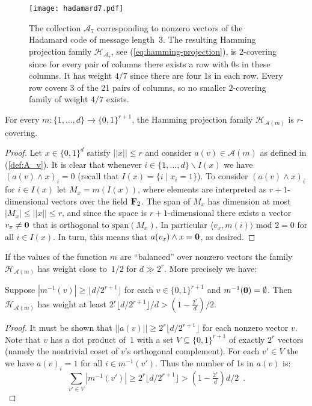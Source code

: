 \documentclass[prodmode,acmtalg]{acmsmall}
\newcommand{\floor}[1]{\lfloor{#1}\rfloor}
\begin{document}
\begin{figure}[t]
	\begin{center}
\texttt{[image: hadamard7.pdf]}
\caption{The collection $\mathcal{A}_7$ corresponding to nonzero vectors of the Hadamard code of message length~3. The resulting Hamming projection family  $\mathcal{H}_{\mathcal{A}_7}$, see (\ref{eq:hamming-projection}), is $2$-covering since for every pair of columns there exists a row with 0s in these columns. It has weight $4/7$ since there are four 1s in each row.
Every row covers 3 of the 21 pairs of columns, so no smaller $2$-covering family of weight $4/7$ exists.}\label{fig:hadamard7}
	\end{center}
\end{figure}

\begin{lemma}\label{lemma:covering1}
For every $m: \{1,\dots,d\} \rightarrow \{0,1\}^{r+1}$, the Hamming projection family $\mathcal{H}_{\mathcal{A}(m)}$ is $r$-covering.
\end{lemma}
\begin{proof}
Let $x\in \{0,1\}^d$ satisfy $||x|| \leq r$ and consider $a(v)\in \mathcal{A}(m)$ as defined in (\ref{def:A_v}).
It is clear that whenever $i\in \{1,\dots,d\} \backslash I(x)$ we have $(a(v) \wedge x)_i = 0$ (recall that $I(x) = \{ i \; | \; x_i = 1\}$).
To consider $(a(v)\wedge x)_i$ for $i\in I(x)$ let $M_x = m(I(x))$, where elements are interpreted as $r+1$-dimensional vectors over the field ${\bf F}_2$.
The span of $M_x$ has dimension at most $|M_x| \leq ||x|| \leq r$, and since the space is $r+1$-dimensional there exists a vector $v_x\ne {\bf 0}$ that is orthogonal to $\text{span}(M_x)$.
In particular $\langle v_x,m(i)\rangle \text{ mod } 2 = 0$ for all $i\in I(x)$.
In turn, this means that $a(v_x) \wedge x = {\bf 0}$, as desired. 
\end{proof}

If the values of the function $m$ are ``balanced'' over nonzero vectors the family $\mathcal{H}_{\mathcal{A}(m)}$ has weight close to~$1/2$ for $d\gg 2^r$. 
More precisely we have:
\begin{lemma}\label{lemma:weight}
Suppose $|m^{-1}(v)|\geq \floor{d/2^{r+1}}$ for each $v\in \{0,1\}^{r+1}$ and $m^{-1}({\bf 0}) = \emptyset$. Then $\mathcal{H}_{\mathcal{A}(m)}$ has weight at least $2^r \floor{d/2^{r+1}}/d > \left(1-\tfrac{2^r}{d}\right)/2$.
\end{lemma}
\begin{proof}
It must be shown that $||a(v)|| \geq 2^r \floor{d/2^{r+1}}$ for each nonzero vector $v$.
Note that $v$ has a dot product of~1 with a set $V \subseteq \{0,1\}^{r+1}$ of exactly $2^{r}$ vectors (namely the nontrivial coset of $v$'s orthogonal complement).
For each $v'\in V$ the we have $a(v)_i = 1$ for all $i\in m^{-1}(v')$.
Thus the number of 1s in $a(v)$ is:
$$ \sum_{v'\in V} |m^{-1}(v')| \geq 2^r \floor{d/2^{r+1}} > \left(1-\tfrac{2^r}{d}\right)d/2\enspace . $$  
\end{proof}
\end{document}
